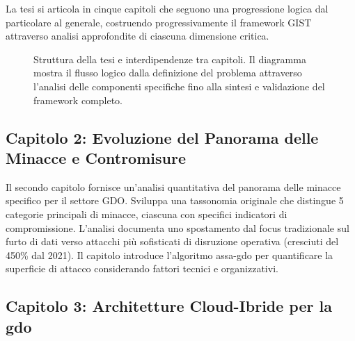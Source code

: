 La tesi si articola in cinque capitoli che seguono una progressione logica dal particolare al generale, costruendo progressivamente il framework GIST attraverso analisi approfondite di ciascuna dimensione critica.

\begin{figure}[H]
\centering
{}
\caption{Struttura della tesi e interdipendenze tra capitoli. Il diagramma mostra il flusso logico dalla definizione del problema attraverso l'analisi delle componenti specifiche fino alla sintesi e validazione del framework completo.}
\label{fig:thesis_structure}
\end{figure}

\subsection{\texorpdfstring{Capitolo 2: Evoluzione del Panorama delle Minacce e Contromisure}{1.6.1 - Capitolo 2: Evoluzione del Panorama delle Minacce e Contromisure}}
\label{subsec:struttura_cap2}

Il secondo capitolo fornisce un'analisi quantitativa del panorama delle minacce specifico per il settore GDO. Sviluppa una tassonomia originale che distingue 5 categorie principali di minacce, ciascuna con specifici indicatori di compromissione. L'analisi documenta uno spostamento dal focus tradizionale sul furto di dati verso attacchi più sofisticati di disruzione operativa (cresciuti del 450\% dal 2021). Il capitolo introduce l'algoritmo \gls{assa-gdo} per quantificare la superficie di attacco considerando fattori tecnici e organizzativi.

\subsection{\texorpdfstring{Capitolo 3: Architetture Cloud-Ibride per la \gls{gdo}}{1.6.2 - Capitolo 3: Architetture Cloud-Ibride per la GDO}}
\label{subsec:struttura_cap3}

